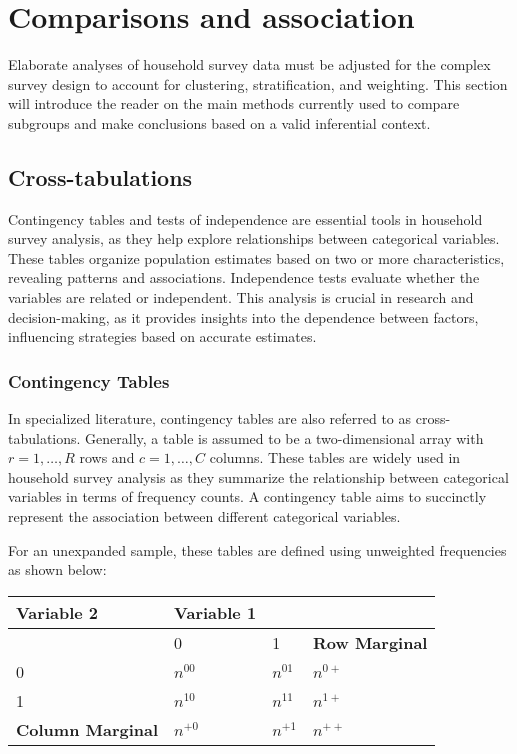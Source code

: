 \documentclass[
  12pt,
]{book}
\begin{document}
\chapter{Comparisons and association}\label{comparisons-and-association}

Elaborate analyses of household survey data must be adjusted for the complex survey design to account for clustering, stratification, and weighting. This section will introduce the reader on the main methods currently used to compare subgroups and make conclusions based on a valid inferential context.

\section{Cross-tabulations}\label{cross-tabulations}

Contingency tables and tests of independence are essential tools in household survey analysis, as they help explore relationships between categorical variables. These tables organize population estimates based on two or more characteristics, revealing patterns and associations. Independence tests evaluate whether the variables are related or independent. This analysis is crucial in research and decision-making, as it provides insights into the dependence between factors, influencing strategies based on accurate estimates.

\subsection{Contingency Tables}\label{contingency-tables}

In specialized literature, contingency tables are also referred to as cross-tabulations. Generally, a table is assumed to be a two-dimensional array with \(r=1,\ldots,R\) rows and \(c=1,\ldots,C\) columns. These tables are widely used in household survey analysis as they summarize the relationship between categorical variables in terms of frequency counts. A contingency table aims to succinctly represent the association between different categorical variables.

For an unexpanded sample, these tables are defined using unweighted frequencies as shown below:

\begin{longtable}[]{@{}llll@{}}
\toprule\noalign{}
\textbf{Variable 2} & \textbf{Variable 1} & & \\
\midrule\noalign{}
\endhead
\bottomrule\noalign{}
\endlastfoot
& 0 & 1 & \textbf{Row Marginal} \\
0 & \(n^{00}\) & \(n^{01}\) & \(n^{0+}\) \\
1 & \(n^{10}\) & \(n^{11}\) & \(n^{1+}\) \\
\textbf{Column Marginal} & \(n^{+0}\) & \(n^{+1}\) & \(n^{++}\) \\
\end{longtable}
\end{document}
